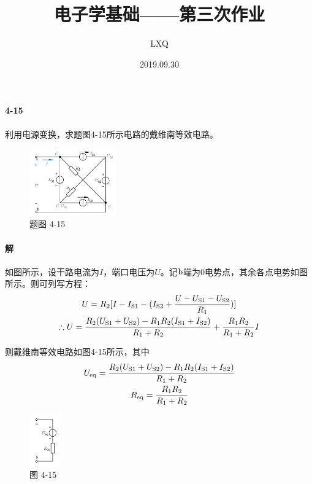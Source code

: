 \documentclass[hyperref, UTF8]{ctexart}
\title{电子学基础——第三次作业}
\author{LXQ}
\date{2019.09.30}
\newcommand{\source}{{\rm S}}
\begin{document}
\maketitle

\paragraph{4-15}\label{4-15}
利用电源变换，求题图4-15所示电路的戴维南等效电路。

\begin{figure}[!htb]
\centering
\includegraphics[width=0.333\textwidth]{p4-15.png}
\caption*{题图 4-15}
\end{figure}

\paragraph{解}如图所示，设干路电流为$I$，端口电压为$U$。记$\rm b$端为$0$电势点，其余各点电势如图所示。则可列写方程：
\begin{gather*}
U = R_2[I - I_{\source 1} - (I_{\source 2} + \frac{U-U_{\source 1}-U_{\source 2}}{R_1})] \\
\therefore U = \frac{R_2(U_{\source 1}+U_{\source 2}) - R_1R_2(I_{\source 1}+I_{\source 2})}{R_1+R_2} + \frac{R_1R_2}{R_1+R_2}I
\end{gather*}

则戴维南等效电路如图4-15所示，其中
\begin{gather*}
U_{\rm eq}=\frac{R_2(U_{\source 1}+U_{\source 2}) - R_1R_2(I_{\source 1}+I_{\source 2})}{R_1+R_2} \\
R_{\rm eq}=\frac{R_1R_2}{R_1+R_2}
\end{gather*}

\begin{figure}[!htb]
\centering
\includegraphics[width=0.120\textwidth]{p4-15-sol.png}
\caption*{图 4-15}
\end{figure}
\end{document}
